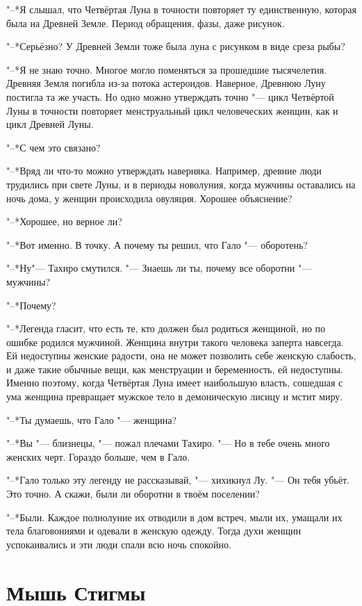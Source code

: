 "--*Я слышал, что Четвёртая Луна в точности повторяет ту единственную, которая была на Древней Земле.
Период обращения, фазы, даже рисунок.

"--*Серьёзно?
У Древней Земли тоже была луна с рисунком в виде среза рыбы?

"--*Я не знаю точно.
Многое могло поменяться за прошедшие тысячелетия.
Древняя Земля погибла из-за потока астероидов.
Наверное, Древнюю Луну постигла та же участь.
Но одно можно утверждать точно "--- цикл Четвёртой Луны в точности повторяет менструальный цикл человеческих женщин, как и цикл Древней Луны.

"--*С чем это связано?

"--*Вряд ли что-то можно утверждать наверняка.
Например, древние люди трудились при свете Луны, и в периоды новолуния, когда мужчины оставались на ночь дома, у женщин происходила овуляция.
Хорошее объяснение?

"--*Хорошее, но верное ли?

"--*Вот именно.
В точку.
А почему ты решил, что Гало "--- оборотень?

"--*Ну\ldotst "--- Тахиро смутился.
"--- Знаешь ли ты, почему все оборотни "--- мужчины?

"--*Почему?

"--*Легенда гласит, что есть те, кто должен был родиться женщиной, но по ошибке родился мужчиной.
Женщина внутри такого человека заперта навсегда.
Ей недоступны женские радости, она не может позволить себе женскую слабость, и даже такие обычные вещи, как менструации и беременность, ей недоступны.
Именно поэтому, когда Четвёртая Луна имеет наибольшую власть, сошедшая с ума женщина превращает мужское тело в демоническую лисицу и мстит миру.

"--*Ты думаешь, что Гало "--- женщина?

"--*Вы "--- близнецы, "--- пожал плечами Тахиро.
"--- Но в тебе очень много женских черт.
Гораздо больше, чем в Гало.

"--*Гало только эту легенду не рассказывай, "--- хихикнул Лу.
"--- Он тебя убьёт.
Это точно.
А скажи, были ли оборотни в твоём поселении?

"--*Были.
Каждое полнолуние их отводили в дом встреч, мыли их, умащали их тела благовониями и одевали в женскую одежду.
Тогда духи женщин успокаивались и эти люди спали всю ночь спокойно.

\section{Мышь Стигмы}

